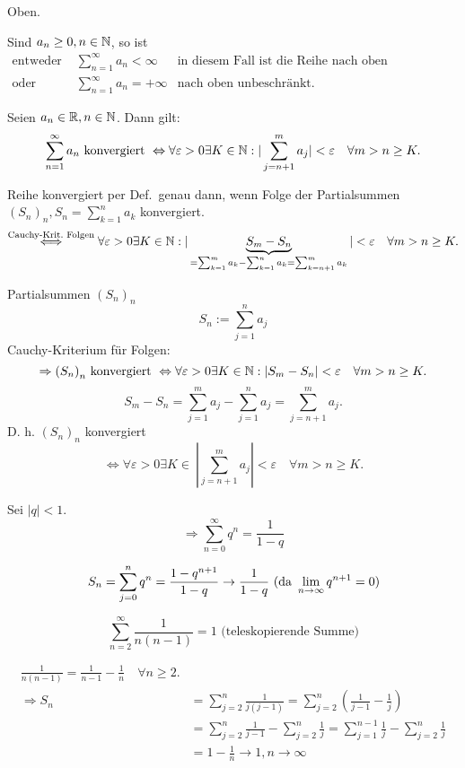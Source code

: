 \documentclass[../ana1.tex]{subfiles}
\begin{document}
\begin{bew}
	Oben.
\end{bew}
\begin{kor}
	Sind \(a_n \geq 0, n\in \mathbb{N} \), so ist
	\begin{align*}
		\text{entweder } &\sum_{n=1}^{\infty}a_n < \infty &\text{in diesem Fall ist die Reihe nach oben beschränkt.}\\
		\text{oder } &\sum_{n=1}^{\infty}a_n = +\infty &\text{nach oben unbeschränkt.}
	\end{align*}
\end{kor}
\begin{satz}
	Seien \(a_n \in\mathbb{R}, n\in\mathbb{N} \). Dann gilt: 
	\[ \sum_{n=1}^{\infty} a_n \text{ konvergiert } \Leftrightarrow \forall \varepsilon >0 \exists K \in \mathbb{N} : | \sum_{j=n+1}^{m}a_j|<\varepsilon \quad \forall m>n\geq K.\]
\end{satz}
\begin{bew}
	Reihe konvergiert per Def.\ genau dann, wenn Folge der Partialsummen \( {(S_n)}_n, S_n = \sum_{k=1}^{n}a_k \) konvergiert.
	\[ \overset{\text{Cauchy-Krit.\ Folgen}}{\Longleftrightarrow} \forall \varepsilon > 0 \exists K\in\N: |\underbrace{S_m-S_n}_{=\sum_{k=1}^{m}a_k-\sum_{k=1}^{n}a_k=\sum_{k=n+1}^{m}a_k}|<\varepsilon \quad \forall m>n\geq K. \]
\end{bew}
\begin{bew}
	Partialsummen \({(S_n)}_n\)
	\[ S_n := \sum_{j=1}^{n} a_j \]
	Cauchy-Kriterium  für Folgen:
	\[ \Rightarrow {(S_n)}_n \text{ konvergiert } \Leftrightarrow \forall \varepsilon > 0 \exists K\in\mathbb{N}:|S_m-S_n|<\varepsilon \quad \forall m>n\geq K. \]
	\[ S_m - S_n = \sum_{j=1}^{m}a_j - \sum_{j=1}^{n} a_j = \sum_{j=n+1}^{m} a_j. \]
	D. h. \({(S_n)}_n\) konvergiert \[ \Leftrightarrow \forall \varepsilon > 0 \exists K\in \: \left|\sum_{j=n+1}^{m}a_j\right|<\varepsilon \quad \forall m>n\geq K. \]
\end{bew}
\begin{bsp}
	Sei \(|q|<1\).
	\[ \Rightarrow \sum_{n=0}^{\infty} q^n = \frac{1}{1-q} \]
\end{bsp}
\begin{bsp}
	\[S_n = \sum_{j=0}^{n} q^n = \frac{1-q^{n+1}}{1-q} \rightarrow \frac{1}{1-q} \text{ (da } \lim\limits_{n\rightarrow\infty}q^{n+1}=0 \text{)} \]
\end{bsp}
\begin{bsp}
	\[\sum_{n=2}^{\infty}\frac{1}{n(n-1)}=1 \text{ (teleskopierende Summe)} \]
\end{bsp}
\begin{bew}
	\begin{align*}
		\frac{1}{n(n-1)} =\frac{1}{n-1} - \frac{1}{n} \quad\forall n\geq 2.\\
		\Rightarrow S_n &= \sum_{j=2}^{n} \frac{1}{j(j-1)} = \sum_{j=2}^{n} \left( \frac{1}{j-1} - \frac{1}{j} \right)\\
		&= \sum_{j=2}^{n} \frac{1}{j-1} - \sum_{j=2}^{n} \frac{1}{j} = \sum_{j=1}^{n-1}\frac{1}{j} - \sum_{j=2}^{n}\frac{1}{j}\\
		&= 1 - \frac{1}{n} \rightarrow 1, n\rightarrow \infty
	\end{align*}
\end{bew}
\end{document}
